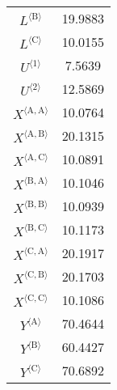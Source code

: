 \begin{tabular}{c|c|}
${L}^{\langle \mathrm{B}\rangle}$ & 19.9883 \\
${L}^{\langle \mathrm{C}\rangle}$ & 10.0155 \\
${U}^{\langle \mathrm{1}\rangle}$ & 7.5639 \\
${U}^{\langle \mathrm{2}\rangle}$ & 12.5869 \\
${X}^{\langle \mathrm{A},\mathrm{A}\rangle}$ & 10.0764 \\
${X}^{\langle \mathrm{A},\mathrm{B}\rangle}$ & 20.1315 \\
${X}^{\langle \mathrm{A},\mathrm{C}\rangle}$ & 10.0891 \\
${X}^{\langle \mathrm{B},\mathrm{A}\rangle}$ & 10.1046 \\
${X}^{\langle \mathrm{B},\mathrm{B}\rangle}$ & 10.0939 \\
${X}^{\langle \mathrm{B},\mathrm{C}\rangle}$ & 10.1173 \\
${X}^{\langle \mathrm{C},\mathrm{A}\rangle}$ & 20.1917 \\
${X}^{\langle \mathrm{C},\mathrm{B}\rangle}$ & 20.1703 \\
${X}^{\langle \mathrm{C},\mathrm{C}\rangle}$ & 10.1086 \\
${Y}^{\langle \mathrm{A}\rangle}$ & 70.4644 \\
${Y}^{\langle \mathrm{B}\rangle}$ & 60.4427 \\
${Y}^{\langle \mathrm{C}\rangle}$ & 70.6892 \\
\hline
\end{tabular}


